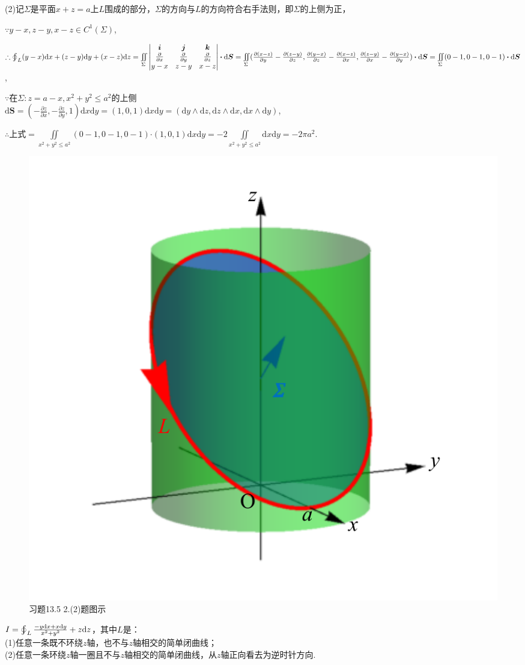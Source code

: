 \documentclass[12pt,UTF8,fleqn]{ctexart}
\newcommand{\varIInt}[4]{\iint\limits_{#1}#2\mathrm d#3\mathrm d#4}
\newcommand{\BLOInt}[2]{\varoint\nolimits_{#1}#2}
\newcommand{\md}[1]{\mathrm d#1}
\newcommand{\BSIInt}[2]{\iint\limits_{#1}#2}
\newcommand{\pp}[2]{\frac{\partial #1}{\partial #2}}
\begin{document}
\begin{enumerate}
(2)记$\Sigma$是平面$x+z=a$上$L$围成的部分，$\Sigma$的方向与$L$的方向符合右手法则，即$\Sigma$的上侧为正，

$\because y-x,z-y,x-z\in C^1(\Sigma)$,

$\therefore\BLOInt L{(y-x)\md x+(z-y)\md y+(x-z)\md z}=\BSIInt\Sigma{\begin{vmatrix}
\bm i&\bm j&\bm k\\
\frac\partial{\partial x}&\frac\partial{\partial y}&\frac\partial{\partial z}\\
y-x&z-y&x-z
\end{vmatrix}\bm\cdot\md\bm S}\\
=\BSIInt\Sigma{(\pp{(x-z)}y-\pp{(z-y)}z,\pp{(y-x)}z-\pp{(x-z)}x,\pp{(z-y)}x-\pp{(y-x)}y)\bm\cdot\md\bm S}=\BSIInt\Sigma{(0-1,0-1,0-1)\bm\cdot\md\bm S}$,

$\because$在$\Sigma:z=a-x,x^2+y^2\leqslant a^2$的上侧\\
$\md\bm S=(-\pp zx,-\pp zy,1)\md x\md y=(1,0,1)\md x\md y=(\md y\wedge\md z,\md z\wedge\md x,\md x\wedge\md y)$,

$\therefore$上式$=\varIInt{x^2+y^2\leqslant a^2}{(0-1,0-1,0-1)\bm\cdot(1,0,1)}xy=-2\varIInt{x^2+y^2\leqslant a^2}{}xy=-2\pi a^2$.

\begin{figure}[H]
\begin{center}
\includegraphics[height=0.5\textheight]{Figures24/Fig13-5-2-2.pdf}
\end{center}
\caption{习题13.5 2.(2)题图示}
\label{13-5-2-2}
\end{figure}
$I=\BLOInt L{\frac{-y\md x+x\md y}{x^2+y^2}+z\md z}$，其中$L$是：\\
(1)任意一条既不环绕$z$轴，也不与$z$轴相交的简单闭曲线；\\
(2)任意一条环绕$z$轴一圈且不与$z$轴相交的简单闭曲线，从$z$轴正向看去为逆时针方向.


\end{enumerate}
\end{document}
